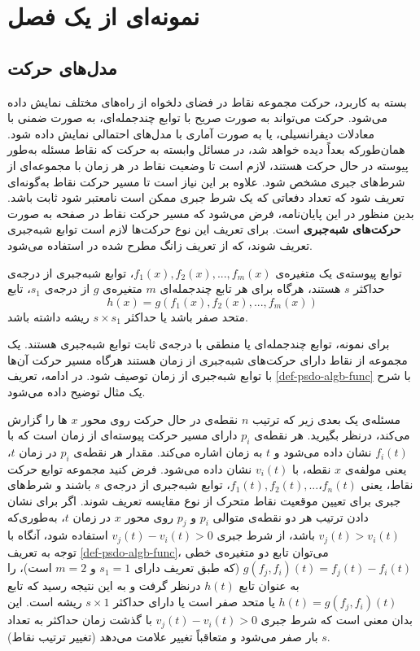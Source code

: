 \chapter{ نمونه‌ای از یک فصل}
\section{مدل‌های حرکت}\label{sec-model-motion}
بسته به کاربرد، حرکت مجموعه نقاط در فضای دلخواه از راه‌های مختلف نمایش داده می‌شود. حرکت می‌تواند به صورت صریح با توابع چندجمله‌ای، به صورت ضمنی با معادلات دیفرانسیلی، یا به صورت آماری با مدل‌های احتمالی نمایش داده شود. همان‌طورکه بعداً دیده خواهد شد، در مسائل وابسته به حرکت که نقاط مسئله به‌طور پیوسته در حال حرکت هستند، لازم است تا وضعیت نقاط در هر زمان با مجموعه‌ای از شرط‌های جبری مشخص شود. علاوه بر این نیاز است تا مسیر حرکت نقاط به‌گونه‌ای تعریف شود که تعداد دفعاتی که یک شرط جبری ممکن است نامعتبر ‌شود ثابت باشد. بدین منظور در این پایان‌نامه، فرض می‌شود که مسیر حرکت نقاط در صفحه به صورت  \textbf{حرکت‌های شبه‌جبری} است. برای تعریف این نوع حرکت‌ها لازم است توابع شبه‌جبری تعریف شوند، که از تعریف زانگ مطرح شده در
 استفاده می‌شود. 

\begin{definition}\label{def-psdo-algb-func}
توابع پیوسته‌ی یک متغیره‌ی $f_{1}(x), f_{2}(x), ... , f_{m}(x)$، توابع شبه‌جبری از درجه‌ی حداکثر $s$ هستند، هرگاه برای هر تابع چندجمله‌ای $m$ متغیره‌ی $g$  از درجه‌ی $s_{1}$،  تابع  $$h(x) = g(f_{1}(x), f_{2}(x), ... , f_{m}(x))$$  متحد صفر باشد یا حداکثر $s \times s_{1}$  ریشه داشته باشد.
 \end{definition}
  برای نمونه، توابع چندجمله‌ای یا منطقی با درجه‌ی ثابت توابع شبه‌جبری هستند. یک مجموعه از نقاط دارای حرکت‌های شبه‌جبری از زمان هستند هرگاه مسیر حرکت آن‌ها با توابع شبه‌جبری از زمان توصیف شود. در ادامه، تعریف \ref{def-psdo-algb-func} با شرح یک مثال توضیح داده می‌شود. 
 
مسئله‌ی یک بعدی زیر که ترتیب $n$ نقطه‌ی در حال حرکت روی محور $x$ ها را گزارش می‌کند، درنظر بگیرید. هر نقطه‌ی $p_{i}$  دارای مسیر حرکت پیوسته‌ای از زمان است که با $f_{i}(t)$  نشان داده می‌شود و $t$ به زمان اشاره می‌کند. مقدار هر نقطه‌ی $p_{i}$  در زمان $t$، یعنی مولفه‌ی $x$ نقطه، با $v_{i}(t)$ نشان داده می‌شود. فرض کنید مجموعه توابع حرکت نقاط، یعنی $f_{1}(t), f_{2}(t), ... ، f_{n}(t)$،  توابع شبه‌جبری از درجه‌ی $s$ باشند و شرط‌های جبری برای تعیین موقعیت نقاط متحرک از نوع مقایسه تعریف شوند. اگر برای نشان دادن ترتیب هر دو نقطه‌ی متوالی $p_{i}$ و $p_{j}$ روی محور $x$ در زمان $t$، به‌طوری‌که $ v_{j}(t) > v_{i}(t)$ باشد، از شرط جبری $ v_{j}(t) - v_{i}(t) > 0$  استفاده شود، آنگاه با توجه به تعریف \mbox{\ref{def-psdo-algb-func}}، می‌توان تابع دو متغیره‌ی خطی $g(f_{j}, f_{i})(t) =  f_{j}(t) - f_{i}(t)$ (که طبق تعریف دارای $s_{1} = 1$ و $m = 2$ است)، را به عنوان تابع $h(t)$ درنظر گرفت و به این نتیجه رسید که تابع $h(t) = g(f_{j}, f_{i})(t)$ یا متحد صفر است یا دارای حداکثر $s \times 1$  ریشه است. این بدان معنی است که شرط جبری $ v_{j}(t) - v_{i}(t) > 0$ با گذشت زمان حداکثر به تعداد $s$ بار صفر می‌شود و متعاقباً تغییر علامت می‌دهد (تغییر ترتیب نقاط).
 
